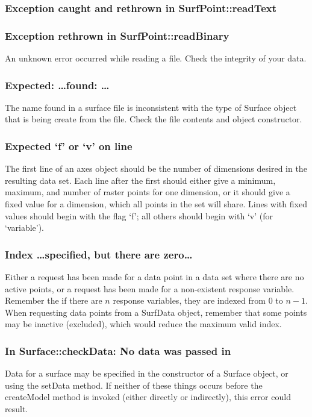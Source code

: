 \documentclass{article}
\begin{document}
\subsubsection{Exception caught and rethrown in SurfPoint::readText}
\subsubsection{Exception rethrown in SurfPoint::readBinary}
An unknown error occurred while reading a file.  Check the integrity of your data.

\subsubsection{Expected: \ldots found: \ldots} 
The name found in a surface file is inconsistent with the type of Surface object that is being create from the file.  Check the file contents and object constructor.

\subsubsection{Expected `f' or `v' on line}
The first line of an axes object should be the number of dimensions desired in the resulting data set.  Each line after the first should either give a minimum, maximum, and number of raster points for one dimension, or it should give a fixed value for a dimension, which all points in the set will share.  Lines with fixed values should begin with the flag `f'; all others should begin with `v' (for `variable').
\subsubsection{Index \ldots specified, but there are zero\ldots}
Either a request has been made for a data point in a data set where there are no active points, or a request has been made for a non-existent response variable.  Remember the if there are $n$ response variables, they are indexed from $0$ to $n-1$.  When requesting data points from a SurfData object, remember that some points may be inactive (excluded), which would reduce the maximum valid index.

\subsubsection{In Surface::checkData: No data was passed in}
Data for a surface may be specified in the constructor of a Surface object, or using the setData method.  If neither of these things occurs before the createModel method is invoked (either directly or indirectly), this error could result.
\end{document}
